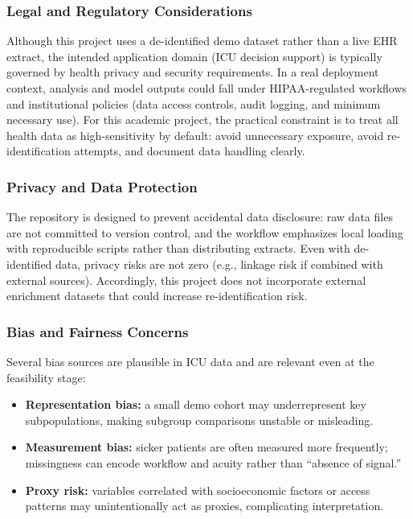 \documentclass[12pt]{article}
\begin{document}
\subsubsection*{Legal and Regulatory Considerations}
Although this project uses a de-identified demo dataset rather than a live EHR extract, the intended application domain (ICU decision support) is typically governed by health privacy and security requirements. In a real deployment context, analysis and model outputs could fall under HIPAA-regulated workflows and institutional policies (data access controls, audit logging, and minimum necessary use). For this academic project, the practical constraint is to treat all health data as high-sensitivity by default: avoid unnecessary exposure, avoid re-identification attempts, and document data handling clearly.

\subsubsection*{Privacy and Data Protection}
The repository is designed to prevent accidental data disclosure: raw data files are not committed to version control, and the workflow emphasizes local loading with reproducible scripts rather than distributing extracts. Even with de-identified data, privacy risks are not zero (e.g., linkage risk if combined with external sources). Accordingly, this project does not incorporate external enrichment datasets that could increase re-identification risk.

\subsubsection*{Bias and Fairness Concerns}
Several bias sources are plausible in ICU data and are relevant even at the feasibility stage:
\begin{itemize}[leftmargin=1.5em]
    \item \textbf{Representation bias:} a small demo cohort may underrepresent key subpopulations, making subgroup comparisons unstable or misleading.
    \item \textbf{Measurement bias:} sicker patients are often measured more frequently; missingness can encode workflow and acuity rather than ``absence of signal.''
    \item \textbf{Proxy risk:} variables correlated with socioeconomic factors or access patterns may unintentionally act as proxies, complicating interpretation.
\end{itemize}
\end{document}
